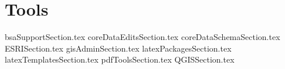 \documentclass[class=report , crop=false, openany, titlepage, twoside, multi={itemize, figure, verbatim}, float=false]{standalone}
\title{}  %
\begin{document}
\ifstandalone
\maketitle %
\clearpage
\tableofcontents %
\clearpage
\fi

\chapter{Tools}
{bsaSupportSection.tex}
\clearpage
{coreDataEditsSection.tex}
\clearpage
{coreDataSchemaSection.tex}
\clearpage
{ESRISection.tex}
\clearpage
{gisAdminSection.tex}
\clearpage
{latexPackagesSection.tex}
\clearpage
{latexTemplatesSection.tex}
\clearpage
{pdfToolsSection.tex}
\clearpage
{QGISSection.tex}
\end{document}
